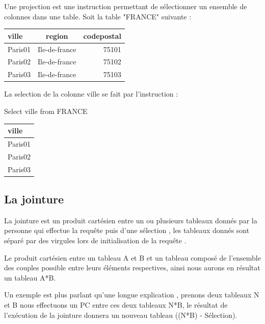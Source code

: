 \documentclass[oneside,13pt,a4paper]{report}
\begin{document}
         Une projection est une instruction permettant de sélectionner un ensemble de colonnes dans une table.
         Soit la table "FRANCE" suivante :



         \begin{tabular}{|l|c|r|}
          \hline
          ville & region & codepostal
          \\
          \hline
          Paris01 & Ile-de-france & 75101 \\
          Paris02 & Ile-de-france & 75102 \\
          Paris03 & Ile-de-france & 75103 \\
          \hline

         \end{tabular}


         La selection de la colonne ville se fait par l'instruction :

         Select ville from FRANCE

         

         \begin{tabular}{|l|}
          \hline
          ville
          \\
          \hline
          Paris01 \\
          Paris02 \\
          Paris03  \\
          \hline


         \end{tabular}
        \subsection{La jointure}

            La jointure est un produit cartésien entre un ou plusieurs tableaux donnés par la personne qui effectue la requête puis d'une sélection , les tableaux donnés sont séparé par des virgules lors de initialisation de la requête .

            Le produit cartésien entre un tableau A et B et un tableau composé de l'ensemble des couples possible entre leurs éléments respectives, ainsi nous aurons en résultat un tableau A*B.

	          Un exemple est plus parlant qu'une longue explication , prenons deux tableaux N et B nous effectuons un PC entre ces deux tableaux N*B, le résultat de l’exécution de la jointure donnera un nouveau tableau ((N*B) - Sélection).

\end{document}
